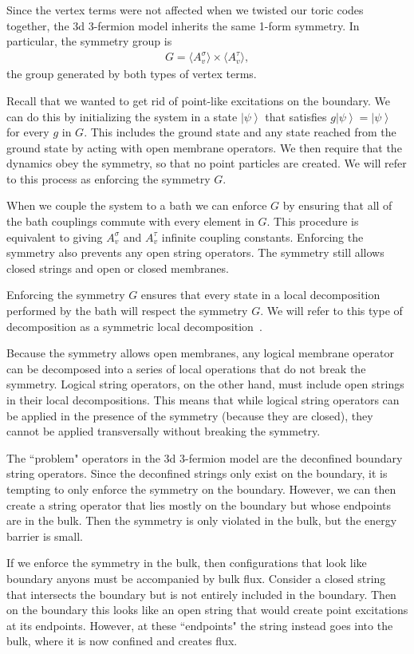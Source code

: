 \documentclass[twocolumn, longbibliography]{revtex4-2}
\newcommand{\ket}[1]{\left|#1\right\rangle}
\begin{document}
Since the vertex terms were not affected when we twisted our toric codes together, the 3d 3-fermion model inherits the same 1-form symmetry. In particular, the symmetry group is 
\begin{align}
G = \langle A_v^\sigma\rangle \times \langle A_v^\tau \rangle,
\end{align}
the group generated by both types of vertex terms.

Recall that we wanted to get rid of point-like excitations on the boundary. We can do this by initializing the system in a state $\ket{\psi}$ that satisfies $g\ket{\psi}=\ket{\psi}$ for every $g$ in $G$. This includes the ground state and any state reached from the ground state by acting with open membrane operators. We then require that the dynamics obey the symmetry, so that no point particles are created. We will refer to this process as enforcing the symmetry $G$.

When we couple the system to a bath we can enforce $G$ by ensuring that all of the bath couplings commute with every element in $G$. This procedure is equivalent to giving $A_v^\sigma$ and $A_v^\tau$ infinite coupling constants. Enforcing the symmetry also prevents any open string operators. The symmetry still allows closed strings and open or closed membranes. 

Enforcing the symmetry $G$ ensures that every state in a local decomposition performed by the bath will respect the symmetry $G$. We will refer to this type of decomposition as a symmetric local decomposition~\cite{RobertsBartlett}.

Because the symmetry allows open membranes, any logical membrane operator can be decomposed into a series of local operations that do not break the symmetry. Logical string operators, on the other hand, must include open strings  in their local decompositions. This means that while logical string operators can be applied in the presence of the symmetry (because they are closed), they cannot be applied transversally without breaking the symmetry.

The ``problem" operators in the 3d 3-fermion model are the deconfined boundary string operators. 
Since the deconfined strings only exist on the boundary, it is tempting to only enforce the symmetry on the boundary. However, we can then create a string operator that lies mostly on the boundary but whose endpoints are in the bulk. Then the symmetry is only violated in the bulk, but the energy barrier is small.

If we enforce the symmetry in the bulk, then configurations that look like boundary anyons must be accompanied by bulk flux. Consider a closed string that intersects the boundary but is not entirely included in the boundary. Then on the boundary this looks like an open string that would create point excitations at its endpoints. However, at these   ``endpoints" the string instead goes into the bulk, where it is now confined and creates flux.
\end{document}
